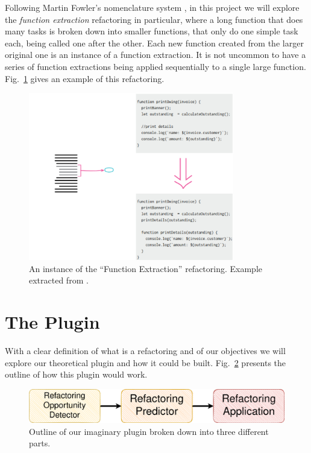 Following Martin Fowler's nomenclature system \citep{martinfowler}, in this project we will explore the \textit{function extraction} refactoring in particular, where a long function that does many tasks is broken down into smaller functions, that only do one simple task each, being called one after the other. Each new function created from the larger original one is an instance of a function extraction. It is not uncommon to have a series of function extractions being applied sequentially to a single large function. Fig.~\ref{img:func_exract} gives an example of this refactoring.


\begin{figure}[!ht]
\centerline{\includegraphics[width=0.8\textwidth]{figuras/func_extract.png}   }
\caption{An instance of the ``Function Extraction'' refactoring. Example extracted from  \citep{martinfowler}.}
\label{img:func_exract}
\end{figure}


\section{The Plugin}

With a clear definition of what is a refactoring and of our objectives we will explore our theoretical plugin and how it could be built. Fig.~\ref{img:plugin} presents the outline of how this plugin would work.

\begin{figure}[!ht]
\centerline{\includegraphics[width=1.1\textwidth]{figuras/plugin.drawio.png}   }
\caption{Outline of our imaginary plugin broken down into three different parts.}
\label{img:plugin}
\end{figure}



